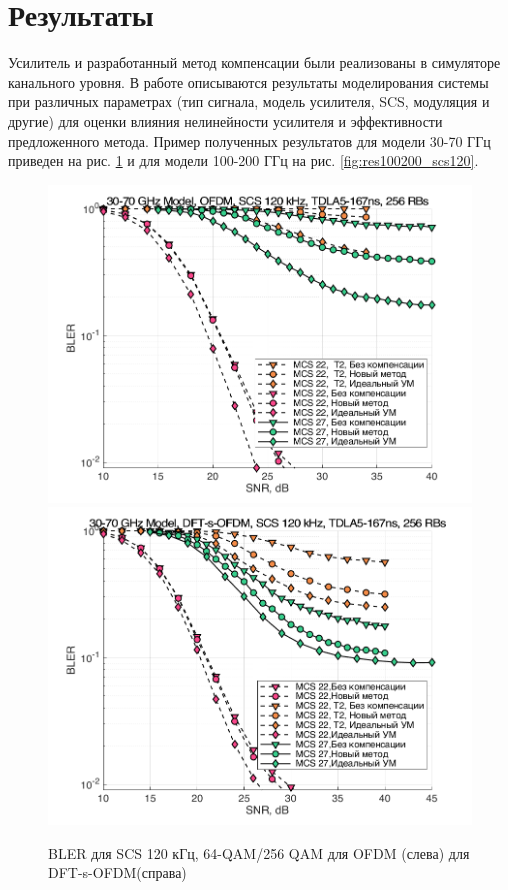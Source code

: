 \documentclass{unn}
\begin{document}
\section{Результаты}
Усилитель и разработанный метод компенсации были реализованы в симуляторе
канального уровня. В работе описываются результаты моделирования системы
при различных параметрах (тип сигнала, модель усилителя, SCS, модуляция и
другие) для оценки влияния нелинейности усилителя и эффективности
предложенного метода. Пример полученных результатов для модели 30-70 ГГц
приведен на рис. \ref{fig:res3070_scs120} и для модели 100-200 ГГц на рис.
\ref{fig:res100200_scs120}.
\begin{figure}[h!]
    \centering
    \includegraphics[width=0.49\linewidth]{figs/res/ofdm/OFDM_Nokia_SCS120_MCS22_27.png}
    \includegraphics[width=0.49\linewidth]{figs/res/dftsofdm/DFT-s-OFDM_Nokia_SCS120_MCS22_27.png}
    \caption{BLER для SCS 120 кГц, 64-QAM/256 QAM для OFDM (слева) для DFT-s-OFDM(справа)}
    \label{fig:res3070_scs120}
\end{figure}
\end{document}
